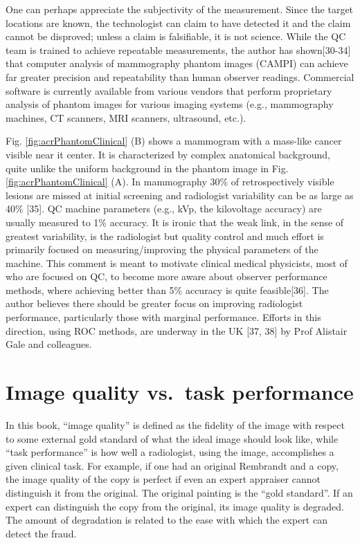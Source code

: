 \documentclass[
]{book}
\begin{document}
One can perhaps appreciate the subjectivity of the measurement. Since the target locations are known, the technologist can claim to have detected it and the claim cannot be disproved; unless a claim is falsifiable, it is not science. While the QC team is trained to achieve repeatable measurements, the author has shown{[}30-34{]} that computer analysis of mammography phantom images (CAMPI) can achieve far greater precision and repeatability than human observer readings. Commercial software is currently available from various vendors that perform proprietary analysis of phantom images for various imaging systems (e.g., mammography machines, CT scanners, MRI scanners, ultrasound, etc.).

Fig. \ref{fig:acrPhantomClinical} (B) shows a mammogram with a mass-like cancer visible near it center. It is characterized by complex anatomical background, quite unlike the uniform background in the phantom image in Fig. \ref{fig:acrPhantomClinical} (A). In mammography 30\% of retrospectively visible lesions are missed at initial screening and radiologist variability can be as large as 40\% {[}35{]}. QC machine parameters (e.g., kVp, the kilovoltage accuracy) are usually measured to 1\% accuracy. It is ironic that the weak link, in the sense of greatest variability, is the radiologist but quality control and much effort is primarily focused on measuring/improving the physical parameters of the machine. This comment is meant to motivate clinical medical physicists, most of who are focused on QC, to become more aware about observer performance methods, where achieving better than 5\% accuracy is quite feasible{[}36{]}. The author believes there should be greater focus on improving radiologist performance, particularly those with marginal performance. Efforts in this direction, using ROC methods, are underway in the UK {[}37, 38{]} by Prof Alistair Gale and colleagues.

\hypertarget{image-quality-vs.-task-performance}{%
\section{Image quality vs.~task performance}\label{image-quality-vs.-task-performance}}

In this book, ``image quality'' is defined as the fidelity of the image with respect to some external gold standard of what the ideal image should look like, while ``task performance'' is how well a radiologist, using the image, accomplishes a given clinical task. For example, if one had an original Rembrandt and a copy, the image quality of the copy is perfect if even an expert appraiser cannot distinguish it from the original. The original painting is the ``gold standard''. If an expert can distinguish the copy from the original, its image quality is degraded. The amount of degradation is related to the ease with which the expert can detect the fraud.
\end{document}

